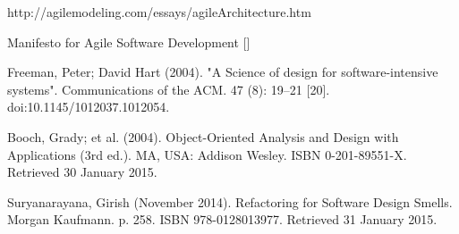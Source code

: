 http://agilemodeling.com/essays/agileArchitecture.htm

Manifesto for Agile Software Development []

Freeman, Peter; David Hart (2004). "A Science of design for software-intensive systems". Communications of the ACM. 47 (8): 19–21 [20]. doi:10.1145/1012037.1012054.

Booch, Grady; et al. (2004). Object-Oriented Analysis and Design with Applications (3rd ed.). MA, USA: Addison Wesley. ISBN 0-201-89551-X. Retrieved 30 January 2015.

Suryanarayana, Girish (November 2014). Refactoring for Software Design Smells. Morgan Kaufmann. p. 258. ISBN 978-0128013977. Retrieved 31 January 2015.



